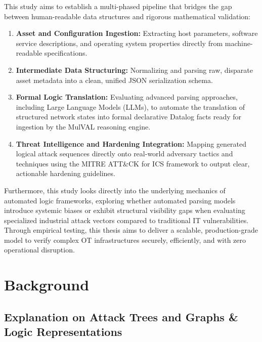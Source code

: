 \documentclass[target=mst,aauheader=aics,style=]{thud}
\begin{document}
This study aims to establish a multi-phased pipeline that bridges the gap between human-readable data structures and rigorous mathematical validation:
\begin{enumerate}
    \item \textbf{Asset and Configuration Ingestion:} Extracting host parameters, software service descriptions, and operating system properties directly from machine-readable specifications.
    \item \textbf{Intermediate Data Structuring:} Normalizing and parsing raw, disparate asset metadata into a clean, unified JSON serialization schema.
    \item \textbf{Formal Logic Translation:} Evaluating advanced parsing approaches, including Large Language Models (LLMs), to automate the translation of structured network states into formal declarative Datalog facts ready for ingestion by the MulVAL reasoning engine.
    \item \textbf{Threat Intelligence and Hardening Integration:} Mapping generated logical attack sequences directly onto real-world adversary tactics and techniques using the MITRE ATT&CK for ICS framework to output clear, actionable hardening guidelines.
\end{enumerate}

Furthermore, this study looks directly into the underlying mechanics of automated logic frameworks, exploring whether automated parsing models introduce systemic biases or exhibit structural visibility gaps when evaluating specialized industrial attack vectors compared to traditional IT vulnerabilities. Through empirical testing, this thesis aims to deliver a scalable, production-grade model to verify complex OT infrastructures securely, efficiently, and with zero operational disruption.


\chapter{Background}

\section{Explanation on Attack Trees and Graphs \& Logic Representations}
\end{document}
